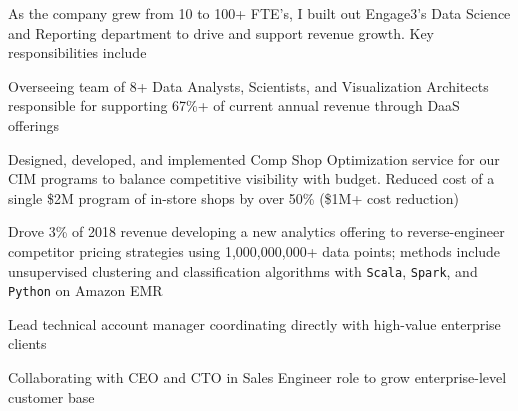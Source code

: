 \documentclass[]{deedy-resume-openfont}
\begin{document}
As the company grew from 10 to 100+ FTE's, I built out Engage3's Data Science and Reporting department to drive and support revenue growth. %
Key responsibilities include
\begin{tightemize}
\item Overseeing team of 8+ Data Analysts, Scientists, and Visualization Architects responsible for supporting 67\%+ of current annual revenue through DaaS offerings
\item Designed, developed, and implemented Comp Shop Optimization service for our CIM programs to balance competitive visibility with budget.  Reduced cost of a single \$2M program of in-store shops by over 50\% (\$1M+ cost reduction)
\item Drove 3\% of 2018 revenue developing a new analytics offering to reverse-engineer competitor pricing strategies using 1,000,000,000+ data points; methods include unsupervised clustering and classification algorithms with \verb|Scala|, \verb|Spark|, and \verb|Python| on Amazon EMR
\item Lead technical account manager coordinating directly with high-value enterprise clients
\item Collaborating with CEO and CTO in Sales Engineer role to grow enterprise-level customer base
\end{tightemize}

\sectionsep
\end{document}
